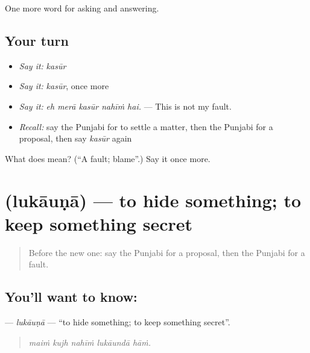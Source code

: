 \begin{grammarlens}[title={What you've built}]
One more word for asking and answering.
\end{grammarlens}

\subsection*{Your turn}
\begin{itemize}
\raggedright
  \item \emph{Say it:} \emph{kasūr}
  \item \emph{Say it:} \emph{kasūr}, once more
  \item \emph{Say it:} \emph{eh merā kasūr nahīṁ hai.} — This is not my fault.
  \item \emph{Recall:} say the Punjabi for to settle a matter, then the Punjabi for a proposal, then say \emph{kasūr} again
\end{itemize}

\begin{tcolorbox}[breakable,colback=teal!4,colframe=teal!35!black,title={Before you move on}]
What does  mean? (\textquotedblleft{}A fault; blame\textquotedblright{}.) Say it once more.
\end{tcolorbox}
\section[\texorpdfstring{\pa{ਲੁਕਾਉਣਾ} (lukāuṇā)}{ਲੁਕਾਉਣਾ (lukāuṇā)}]{ (lukāuṇā) — to hide something; to keep something secret}

\label{lesson:PA-C346-lukauna}



\begin{quote}
Before the new one: say the Punjabi for a proposal, then the Punjabi for a fault.
\end{quote}

\subsection*{You'll want to know: }
\textbf{} — \emph{lukāuṇā} — \textquotedblleft{}to hide something; to keep something secret\textquotedblright{}.

\begin{quote}
    
\end{quote}

\begin{quote}
\emph{maiṁ kujh nahīṁ lukāundā hāṁ.}
\end{quote}


